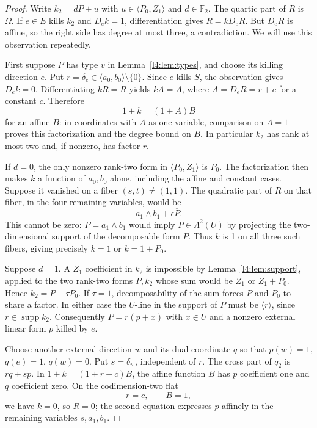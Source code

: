 \documentclass[11pt,a4paper]{article}
\theoremstyle{plain}
\theoremstyle{remark}
\newcommand{\F}{\mathbb F_2}
\newcommand{\supp}{\operatorname{supp}}
\begin{document}
\begin{proof}
Write $k_2=dP+u$ with $u\in\langle P_0,Z_1\rangle$ and $d\in\F$. The quartic part of $R$ is $\Omega$. If $e\in E$ kills $k_2$ and $D_ek=1$, differentiation gives $R=kD_eR$. But $D_eR$ is affine, so the right side has degree at most three, a contradiction. We will use this observation repeatedly.

First suppose $P$ has type $v$ in Lemma~\ref{l4:lem:types}, and choose its killing direction $e$. Put $r=\delta_e\in\langle a_0,b_0\rangle\setminus\{0\}$. Since $e$ kills $S$, the observation gives $D_ek=0$. Differentiating $kR=R$ yields $kA=A$, where $A=D_eR=r+c$ for a constant $c$. Therefore
\[
1+k=(1+A)B
\]
for an affine $B$: in coordinates with $A$ as one variable, comparison on $A=1$ proves this factorization and the degree bound on $B$. In particular $k_2$ has rank at most two and, if nonzero, has factor $r$.

If $d=0$, the only nonzero rank-two form in $\langle P_0,Z_1\rangle$ is $P_0$. The factorization then makes $k$ a function of $a_0,b_0$ alone, including the affine and constant cases. Suppose it vanished on a fiber $(s,t)\ne(1,1)$. The quadratic part of $R$ on that fiber, in the four remaining variables, would be
\[
a_1\wedge b_1+\epsilon\overline P.
\]
This cannot be zero: $\overline P=a_1\wedge b_1$ would imply $P\in\Lambda^2(U)$ by projecting the two-dimensional support of the decomposable form $P$. Thus $k$ is 1 on all three such fibers, giving precisely $k=1$ or $k=1+P_0$.

Suppose $d=1$. A $Z_1$ coefficient in $k_2$ is impossible by Lemma~\ref{l4:lem:support}, applied to the two rank-two forms $P,k_2$ whose sum would be $Z_1$ or $Z_1+P_0$. Hence $k_2=P+\tau P_0$. If $\tau=1$, decomposability of the sum forces $P$ and $P_0$ to share a factor. In either case the $U$-line in the support of $P$ must be $\langle r\rangle$, since $r\in\supp k_2$. Consequently $P=r(p+x)$ with $x\in U$ and a nonzero external linear form $p$ killed by $e$.

Choose another external direction $w$ and its dual coordinate $q$ so that $p(w)=1$, $q(e)=1$, $q(w)=0$. Put $s=\delta_w$, independent of $r$. The cross part of $q_2$ is $rq+sp$. In $1+k=(1+r+c)B$, the affine function $B$ has $p$ coefficient one and $q$ coefficient zero. On the codimension-two flat
\[
r=c,\qquad B=1,
\]
we have $k=0$, so $R=0$; the second equation expresses $p$ affinely in the remaining variables $s,a_1,b_1$.


\end{proof}
\end{document}
